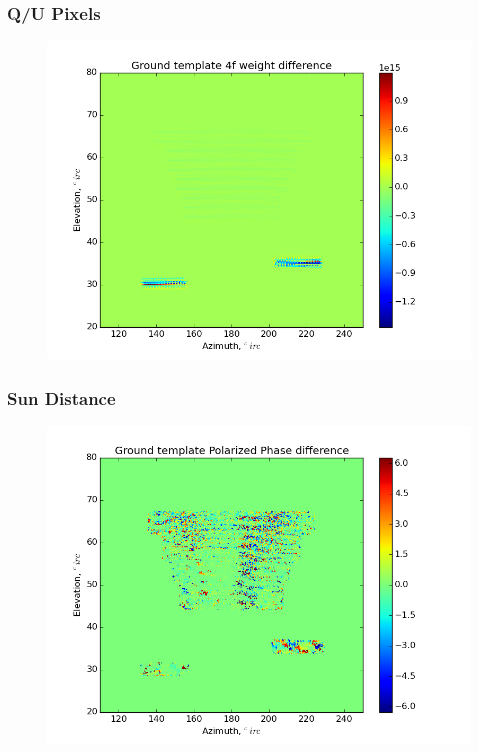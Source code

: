 \documentclass{beamer}
\begin{document}
\begin{frame}
\frametitle{Q/U Pixels}
\begin{figure}
\includegraphics[width=0.9\linewidth]{dw4_gt_QU_PIXEL.png}
\end{figure}
\end{frame}

\begin{frame}
\frametitle{Sun Distance}
\begin{figure}
\includegraphics[width=0.9\linewidth]{dArg_gt_SUN_DIST.png}
\end{figure}
\end{frame}
\end{document}
